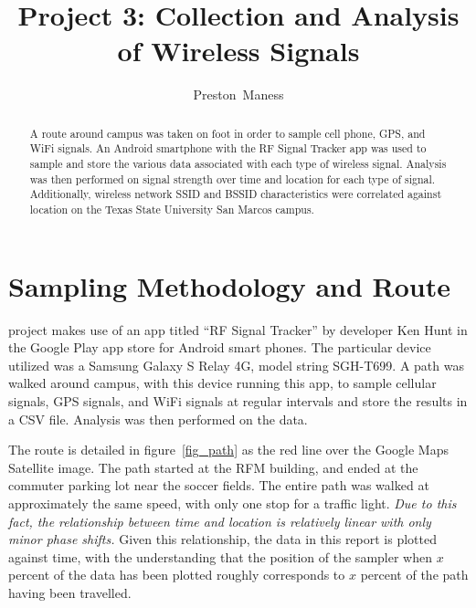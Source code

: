 \documentclass[journal,twocolumn]{IEEEtran}
\begin{document}
\title{Project 3: Collection and Analysis of Wireless Signals}
\author{Preston~Maness}

%
{}

\maketitle

\begin{abstract}
A route around campus was taken on foot in order to sample cell phone, GPS, 
and WiFi signals. An Android smartphone with the RF Signal Tracker 
app was used to sample and store the various data associated with each type 
of wireless signal. Analysis was then performed on signal strength over 
time and location for each type of signal. Additionally, wireless network
SSID and BSSID characteristics were correlated against location on the 
Texas State University San Marcos campus.

\end{abstract}

\section{Sampling Methodology and Route}
 project makes use of an app titled ``RF Signal Tracker'' 
by developer Ken Hunt in the Google Play app store for Android smart phones. 
The particular device utilized was a Samsung Galaxy S Relay 4G, model string 
SGH-T699. A path was walked around campus, with this device running this app,
to sample cellular signals, GPS signals, and WiFi signals at regular intervals
and store the results in a CSV file. Analysis was then performed on the data.

The route is detailed in figure~\ref{fig_path} as the red line over the Google
Maps Satellite image. The path started at the RFM building, and ended at the
commuter parking lot near the soccer fields. The entire path was walked at 
approximately the same speed, with only one stop for a traffic light. \emph{
Due to this fact, the relationship between time and location is relatively 
linear with only minor phase shifts.} Given this relationship, the data in 
this report is plotted against time, with the understanding that the position 
of the sampler when $x$ percent of the data has been plotted roughly 
corresponds to $x$ percent of the path having been travelled.
\end{document}
